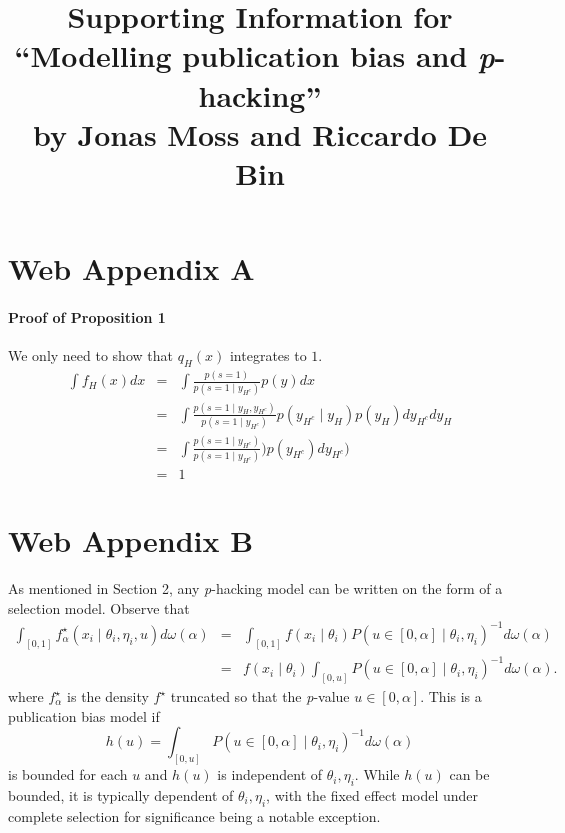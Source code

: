 \documentclass[english]{article}
\title{Supporting Information for ``Modelling publication bias and \textit{p}-hacking''\\ by Jonas Moss and Riccardo De Bin}
\author{}
\date{}
\begin{document}
\maketitle


\section*{Web Appendix A}

\paragraph{Proof of Proposition 1}

We only need to show that $q_{H}(x)$ integrates to $1$.
\begin{eqnarray*}
\int f_{H}(x)dx & = & \int\frac{p(s=1)}{p(s=1\mid y_{H^{c}})}p(y)dx\\
 & = & \int\frac{p(s=1\mid y_{H},y_{H^{c}})}{p(s=1\mid y_{H^{c}})}p(y_{H^{c}}\mid y_{H})p(y_{H})dy_{H^{c}}dy_{H}\\
 & = & \int\frac{p(s=1\mid y_{H^{c}})}{p(s=1\mid y_{H^{c}})})p(y_{H^{c}})dy_{H^{c}})\\
 & = & 1
\end{eqnarray*}




\section*{Web Appendix B}

As mentioned in Section 2, any \textit{p}-hacking model can be written on the form of a selection model. Observe that
\begin{eqnarray*}
\int_{[0,1]}f_\alpha^{\star}(x_{i}\mid\theta_{i},\eta_{i}, u)d\omega(\alpha) & = & \int_{[0,1]}f(x_{i}\mid\theta_{i})P(u\in\left[0,\alpha\right]\mid\theta_{i},\eta_{i})^{-1}d\omega(\alpha)\\
 & = & f(x_{i}\mid\theta_{i})\int_{[0,u]}P(u\in\left[0,\alpha\right]\mid\theta_{i},\eta_{i})^{-1}d\omega(\alpha).
\end{eqnarray*}
where $f_\alpha^{\star}$ is the density $f^{\star}$ truncated so that the \textit{p}-value $u\in\left[0,\alpha\right]$. This is a publication bias model if $$h(u)=\int_{[0,u]}P(u\in\left[0,\alpha\right]\mid\theta_{i},\eta_{i})^{-1}d\omega(\alpha)$$ is bounded for each $u$ and $h(u)$ is independent of $\theta_{i},\eta_{i}$. While $h(u)$ can be bounded, it is typically dependent of $\theta_{i},\eta_{i}$, with the fixed effect model under complete selection for significance being a notable exception.
\end{document}

